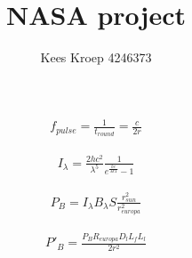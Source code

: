 \documentclass{article}
\title{NASA project}
\author{Kees Kroep 4246373}
\begin{document}

\begin{figure}[ht]\noindent\begin{minipage}[b]{.45\textwidth} \centering \begin{align*}
f_{pulse}=\frac{1}{t_{round}}=\frac{c}{2r}
\end{align*} \end{minipage} \begin{minipage}[b]{.45\textwidth} \centering

\end{minipage} \end{figure}

\begin{figure}[ht]\noindent\begin{minipage}[b]{.45\textwidth} \centering \begin{align*}
I_\lambda = \frac{2hc^2}{\lambda^5}\frac{1}{e^{\frac{hc}{\lambda kT}}-1}
\end{align*} \end{minipage} \begin{minipage}[b]{.45\textwidth} \centering

\end{minipage} \end{figure}

\begin{figure}[ht]\noindent\begin{minipage}[b]{.45\textwidth} \centering \begin{align*}
P_B = I_\lambda B_\lambda S \frac{r_{sun}^2}{r_{europa}^2}
\end{align*} \end{minipage} \begin{minipage}[b]{.45\textwidth} \centering

\end{minipage} \end{figure}

\begin{figure}[ht]\noindent\begin{minipage}[b]{.45\textwidth} \centering \begin{align*}
P'_B = \frac{P_BR_{europa}D_lL_fL_l}{2r^2}
\end{align*} \end{minipage} \begin{minipage}[b]{.45\textwidth} \centering

\end{minipage} \end{figure}
\end{document}
